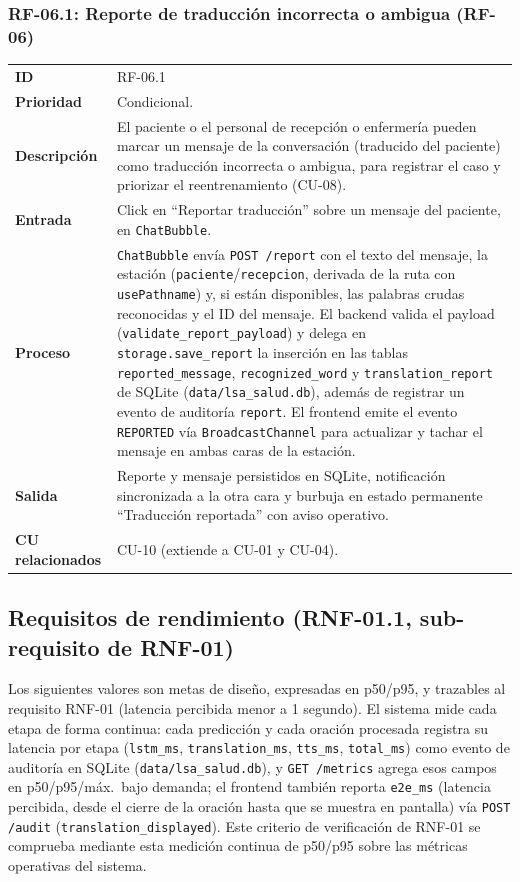 \subsubsection{RF-06.1: Reporte de traducción incorrecta o ambigua (RF-06)}
\begin{table}[H]
\centering
\begin{tabularx}{\textwidth}{l X}
\toprule
\textbf{ID} & RF-06.1 \\
\textbf{Prioridad} & Condicional. \\
\textbf{Descripción} & El paciente o el personal de recepción o enfermería pueden marcar un mensaje de la conversación (traducido del paciente) como traducción incorrecta o ambigua, para registrar el caso y priorizar el reentrenamiento (CU-08). \\
\textbf{Entrada} & Click en ``Reportar traducción'' sobre un mensaje del paciente, en \texttt{ChatBubble}. \\
\textbf{Proceso} & \texttt{ChatBubble} envía \texttt{POST /report} con el texto del mensaje, la estación (\texttt{paciente}/\texttt{recepcion}, derivada de la ruta con \texttt{usePathname}) y, si están disponibles, las palabras crudas reconocidas y el ID del mensaje. El backend valida el payload (\texttt{validate\_report\_payload}) y delega en \texttt{storage.save\_report} la inserción en las tablas \texttt{reported\_message}, \texttt{recognized\_word} y \texttt{translation\_report} de SQLite (\texttt{data/lsa\_salud.db}), además de registrar un evento de auditoría \texttt{report}. El frontend emite el evento \texttt{REPORTED} vía \texttt{BroadcastChannel} para actualizar y tachar el mensaje en ambas caras de la estación. \\
\textbf{Salida} & Reporte y mensaje persistidos en SQLite, notificación sincronizada a la otra cara y burbuja en estado permanente ``Traducción reportada'' con aviso operativo. \\
\textbf{CU relacionados} & CU-10 (extiende a CU-01 y CU-04). \\
\bottomrule
\end{tabularx}
\end{table}

\subsection{Requisitos de rendimiento (RNF-01.1, sub-requisito de RNF-01)}

Los siguientes valores son metas de diseño, expresadas en p50/p95, y
trazables al requisito RNF-01 (latencia percibida menor a 1 segundo). El
sistema mide cada etapa de
forma continua: cada predicción y cada oración procesada registra su
latencia por etapa (\texttt{lstm\_ms}, \texttt{translation\_ms},
\texttt{tts\_ms}, \texttt{total\_ms}) como evento de auditoría en
SQLite (\texttt{data/lsa\_salud.db}), y \texttt{GET /metrics} agrega esos campos en
p50/p95/máx.\ bajo demanda; el frontend también reporta \texttt{e2e\_ms}
(latencia percibida, desde el cierre de la oración hasta que se muestra
en pantalla) vía \texttt{POST /audit} (\texttt{translation\_displayed}).
Este criterio de verificación de RNF-01 se comprueba mediante esta
medición continua de p50/p95 sobre las métricas operativas del sistema.

